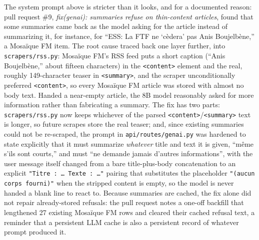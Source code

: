 \begin{sloppypar}
The system prompt above is stricter than it looks, and for a documented reason: pull request \#9, \textit{fix(genai): summaries refuse on thin-content articles}, found that some summaries came back as the model asking for the article instead of summarizing it, for instance, for ``ESS: La FTF ne `cèdera' pas Anis Boujelbène,'' a Mosaïque FM item. The root cause traced back one layer further, into \texttt{scrapers/\allowbreak rss.py}: Mosaïque FM's RSS feed puts a short caption (``Anis Boujelbène,'' about fifteen characters) in the \texttt{<content>} element and the real, roughly 149-character teaser in \texttt{<summary>}, and the scraper unconditionally preferred \texttt{<content>}, so every Mosaïque FM article was stored with almost no body text. Handed a near-empty article, the 8B model reasonably asked for more information rather than fabricating a summary. The fix has two parts: \texttt{scrapers/\allowbreak rss.py} now keeps whichever of the parsed \texttt{<content>}/\texttt{<summary>} text is longer, so future scrapes store the real teaser; and, since existing summaries could not be re-scraped, the prompt in \texttt{api/\allowbreak routes/\allowbreak genai.py} was hardened to state explicitly that it must summarize \emph{whatever} title and text it is given, ``même s'ils sont courts,'' and must ``ne demande jamais d'autres informations'', with the user message itself changed from a bare title-plus-body concatenation to an explicit \texttt{"Titre : \ldots\ Texte : \ldots"} pairing that substitutes the placeholder \texttt{"(aucun corps fourni)"} when the stripped content is empty, so the model is never handed a blank line to react to. Because summaries are cached, the fix alone did not repair already-stored refusals: the pull request notes a one-off backfill that lengthened 27 existing Mosaïque FM rows and cleared their cached refusal text, a reminder that a persistent LLM cache is also a persistent record of whatever prompt produced it.
\end{sloppypar}

